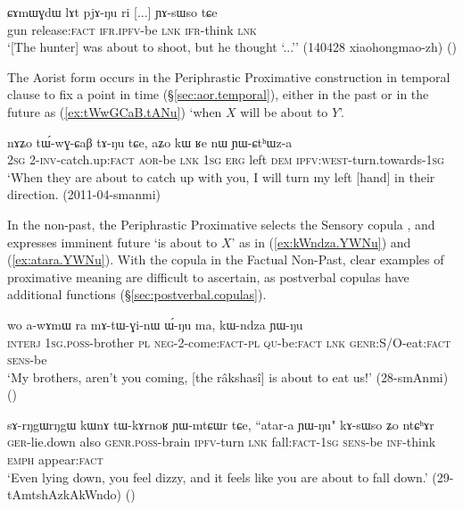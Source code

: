   \begin{exe} 
\ex \label{ex:lAt.pjANu}
\gll  ɕɤmɯɣdɯ lɤt pjɤ-ŋu ri [...] ɲɤ-sɯso tɕe \\
gun release:\textsc{fact} \textsc{ifr}.\textsc{ipfv}-be \textsc{lnk} { } \textsc{ifr}-think \textsc{lnk} \\
\glt `[The hunter] was about to shoot, but he thought `...'' (140428 xiaohongmao-zh) ()
 \end{exe}
 
The Aorist form  occurs in the Periphrastic Proximative construction in temporal clause to fix a point in time (§\ref{sec:aor.temporal}), either in the past or in the future as (\ref{ex:tWwGCaB.tANu}) `when $X$ will be about to $Y$'.

\begin{exe} 
\ex \label{ex:tWwGCaB.tANu}
\gll  nɤʑo tɯ́-wɣ-ɕaβ tɤ-ŋu tɕe, aʑo kɯ ʁe nɯ ɲɯ-ɕtʰɯz-a \\
\textsc{2sg} 2-\textsc{inv}-catch.up:\textsc{fact} \textsc{aor}-be \textsc{lnk} \textsc{1sg} \textsc{erg} left \textsc{dem} \textsc{ipfv}:\textsc{west}-turn.towards-\textsc{1sg} \\ 
\glt `When they are about to catch up with you, I will turn my left [hand] in their direction. (2011-04-smanmi)
 \end{exe}
 
In the non-past, the Periphrastic Proximative selects the Sensory copula , and expresses imminent future `is about to $X$' as in (\ref{ex:kWndza.YWNu}) and (\ref{ex:atara.YWNu}). With the copula in the Factual Non-Past, clear examples of proximative meaning are difficult to ascertain, as postverbal copulas have additional functions (§\ref{sec:postverbal.copulas}).

 \begin{exe} 
\ex \label{ex:kWndza.YWNu}
\gll  wo a-wɤmɯ ra mɤ-tɯ-ɣi-nɯ ɯ́-ŋu ma, kɯ-ndza ɲɯ-ŋu \\
\textsc{interj} \textsc{1sg}.\textsc{poss}-brother \textsc{pl} \textsc{neg}-2-come:\textsc{fact}-\textsc{pl} \textsc{qu}-be:\textsc{fact} \textsc{lnk} \textsc{genr}:S/O-eat:\textsc{fact} \textsc{sens}-be \\
\glt `My brothers, aren't you coming, [the râkshasî] is about to eat us!' (28-smAnmi)
()
 \end{exe}

 \begin{exe} 
\ex \label{ex:atara.YWNu}
\gll sɤ-rŋgɯ\redp{}rŋgɯ kɯnɤ tɯ-kɤrnoʁ ɲɯ-mtɕɯr tɕe, ``atar-a ɲɯ-ŋu" kɤ-sɯso ʑo ntɕʰɤr \\
\textsc{ger}-lie.down also \textsc{genr}.\textsc{poss}-brain \textsc{ipfv}-turn \textsc{lnk} fall:\textsc{fact}-\textsc{1sg} \textsc{sens}-be \textsc{inf}-think \textsc{emph} appear:\textsc{fact} \\
\glt `Even lying down, you feel dizzy, and it feels like you are about to fall down.' (29-tAmtshAzkAkWndo) 
()
 \end{exe}
 

